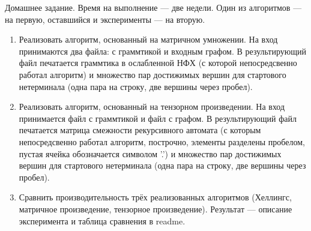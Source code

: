 Домашнее задание. Время на выполнение --- две недели. Один из алгоритмов --- на первую, оставшийся и эксперименты --- на вторую.
\begin{enumerate}
    \item Реализовать алгоритм, основанный на матричном умножении. На вход принимаются два файла: с граммтикой и входным графом. В результирующий файл печатается граммтика в ослабленной НФХ (с которой непосредсвенно работал алгоритм) и множество пар достижимых вершин для стартового нетерминала (одна пара на строку, две вершины через пробел).
    \item Реализовать алгоритм, основанный на тензорном произведении. На вход принимается файл с граммтикой и файл с графом. В результирующий файл печатается матрица смежности рекурсивного автомата (с которым непосредсвенно работал алгоритм, построчно, элементы разделены пробелом, пустая ячейка обозначается символом '.') и множество пар достижимых вершин для стартового нетерминала (одна пара на строку, две вершины через пробел).
    \item Сравнить производительность трёх реализованных алгоритмов (Хеллингс, матричное произведение, тензорное произведение). Результат --- описание эксперимента и таблица сравнения в readme.  
\end{enumerate} 
